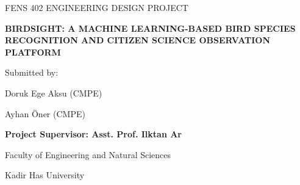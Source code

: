 \begin{titlepage}
    \centering
    \thispagestyle{empty} %
    
    \vspace*{1cm}
    {\fontsize{14}{17}\selectfont FENS 402 ENGINEERING DESIGN PROJECT\par}
    
    \vspace{3.5cm}
    {\fontsize{14}{17}\bfseries BIRDSIGHT: A MACHINE LEARNING-BASED BIRD SPECIES RECOGNITION AND CITIZEN SCIENCE OBSERVATION PLATFORM\par}
    
    \vspace{3.5cm}
    {\fontsize{12}{15}\selectfont Submitted by:\par}
    {\fontsize{12}{15}\selectfont Doruk Ege Aksu (CMPE)\par}
    {\fontsize{12}{15}\selectfont Ayhan Öner (CMPE)\par}
    
    \vspace{3cm}
    {\fontsize{12}{15}\bfseries Project Supervisor: Asst. Prof. Ilktan Ar\par}
    
    \vfill
    
    {\fontsize{12}{15}\selectfont Faculty of Engineering and Natural Sciences\par}
    {\fontsize{12}{15}\selectfont Kadir Has University\par}
    {\fontsize{12}{15}\selectfont \DTMmonthname{\month} \the\year\par} 
\end{titlepage}